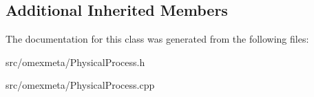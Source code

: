 \subsection*{Additional Inherited Members}


The documentation for this class was generated from the following files\+:\begin{DoxyCompactItemize}
\item 
src/omexmeta/Physical\+Process.\+h\item 
src/omexmeta/Physical\+Process.\+cpp\end{DoxyCompactItemize}

